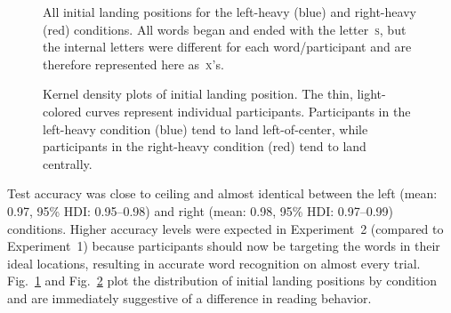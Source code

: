 \documentclass[doc,biblatex]{apa7}
\begin{document}
\begin{figure}
\vspace*{2pt}
\caption{All initial landing positions for the left-heavy (blue) and right-heavy (red) conditions. All words began and ended with the letter~\textsc{s}, but the internal letters were different for each word/participant and are therefore represented here as~\textsc{x}'s.}
\label{fig10}
\end{figure}

\begin{figure}
\vspace*{2pt}
\caption{Kernel density plots of initial landing position. The thin, light-colored curves represent individual participants. Participants in the left-heavy condition (blue) tend to land left-of-center, while participants in the right-heavy condition (red) tend to land centrally.}
\label{fig11}
\end{figure}

Test accuracy was close to ceiling and almost identical between the left (mean: 0.97, 95\% HDI: 0.95--0.98) and right (mean: 0.98, 95\% HDI: 0.97--0.99) conditions. Higher accuracy levels were expected in Experiment~2 (compared to Experiment~1) because participants should now be targeting the words in their ideal locations, resulting in accurate word recognition on almost every trial. Fig.~\ref{fig10} and Fig.~\ref{fig11} plot the distribution of initial landing positions by condition and are immediately suggestive of a difference in reading behavior.
\end{document}
